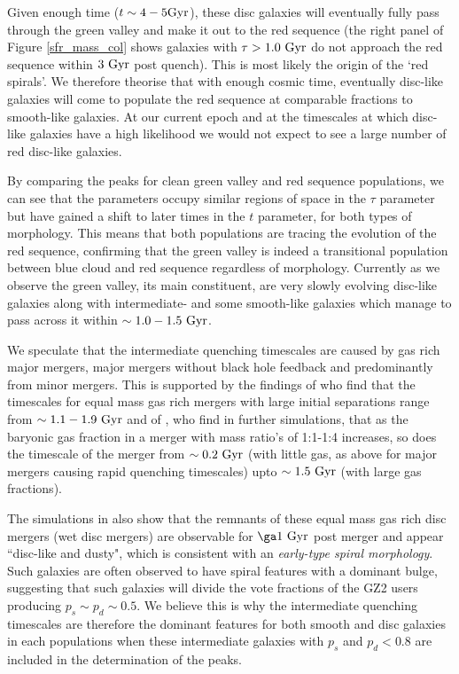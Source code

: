 \documentclass{mn2e}
\begin{document}
Given enough time ($t\sim4-5\rm{Gyr}$), these disc galaxies will eventually fully pass through the green valley and make it out to the red sequence (the right panel of Figure \ref{sfr_mass_col} shows galaxies with $\tau > 1.0~\rm{Gyr}$ do not approach the red sequence within $3~\rm{Gyr}$ post quench). This is most likely the origin of the `red spirals'. We therefore theorise that with enough cosmic time, eventually disc-like galaxies will come to populate the red sequence at comparable fractions to smooth-like galaxies. At our current epoch and at the timescales at which disc-like galaxies have a high likelihood we would not expect to see a large number of red disc-like galaxies. 

By comparing the peaks for clean green valley and red sequence populations, we can see that the parameters occupy similar regions of space in the $\tau$ parameter but have gained a shift to later times in the $t$ parameter, for both types of morphology. This means that both populations are tracing the evolution of the red sequence, confirming that the green valley is indeed a transitional population between blue cloud and red sequence regardless of morphology. Currently as we observe the green valley, its main constituent, are very slowly evolving disc-like galaxies along with intermediate- and some smooth-like galaxies which manage to pass across it within $\sim 1.0-1.5~\rm{Gyr}$.



We speculate that the intermediate quenching timescales are caused by gas rich major mergers, major mergers without black hole feedback and predominantly from minor mergers. This is supported by the findings of \citet{Lotz08}  who find that the timescales for equal mass gas rich mergers with large initial separations range from $\sim 1.1-1.9~\rm{Gyr}$ and of \citet{Lotz11}, who find in further simulations, that as the baryonic gas fraction in a merger with mass ratio's of 1:1-1:4 increases, so does the timescale of the merger from $\sim0.2~\rm{Gyr}$ (with little gas, as above for major mergers causing rapid quenching timescales) upto $\sim1.5~\rm{Gyr}$ (with large gas fractions). 

The simulations in \citet{Lotz08} also show that the remnants of these equal mass gas rich disc mergers (wet disc mergers) are observable for $\ga1~\rm{Gyr}$ post merger and appear ``disc-like and dusty", which is consistent with an \emph{early-type spiral morphology}.  Such galaxies are often observed to have spiral features with a dominant bulge, suggesting that such galaxies will divide the vote fractions of the GZ2 users producing $p_s \sim p_d \sim 0.5$. We believe this is why the intermediate quenching timescales are therefore the dominant features for both smooth and disc galaxies in each populations when these intermediate galaxies with $p_s$ and $p_d < 0.8$ are included in the determination of the peaks. 
\end{document}

